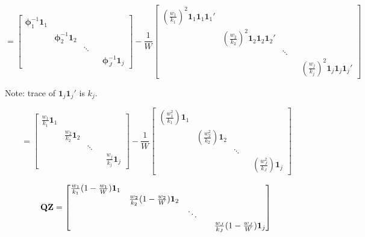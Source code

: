\begin{equation}
     = \begin{bmatrix}
        \mathbf{\phi}_1^{-1}\mathbf{1}_1  & & &  \\
         & \mathbf{\phi}_2^{-1}\mathbf{1}_2  & &  \\
         & & \ddots &  \\
         & & & &   \mathbf{\phi}_J^{-1}\mathbf{1}_j 
    \end{bmatrix} - \frac{1}{W} 
    \begin{bmatrix}
        (\frac{w_1}{k_1})^2\mathbf{1}_1\mathbf{1}_1\mathbf{1}_1' & & & &  \\
         &  (\frac{w_2}{k_2})^2\mathbf{1}_2\mathbf{1}_2\mathbf{1}_2' & & &   \\
         & & \ddots & &  \\
         & & & &  (\frac{w_j}{k_j})^2\mathbf{1}_j\mathbf{1}_j\mathbf{1}_j'
    \end{bmatrix}
     \nonumber
\end{equation}

Note: trace of  $\mathbf{1}_j\mathbf{1}_j'$ is $k_j$. 

\begin{equation}
     = \begin{bmatrix}
        \frac{w_1}{k_1}\mathbf{1}_1  & & & &  \\
         & \frac{w_2}{k_2}\mathbf{1}_2  & & &  \\
         & & \ddots & & \\
         & & & &   \frac{w_j}{k_j}\mathbf{1}_j 
    \end{bmatrix} - \frac{1}{W} 
    \begin{bmatrix}
        (\frac{w_1^2}{k_1})\mathbf{1}_1 & &   &  &     \\
         &  (\frac{w_2^2}{k_2})\mathbf{1}_2 & & &   \\
         & & \ddots & &  \\
         & & & &  (\frac{w_J^2}{k_J})\mathbf{1}_j
    \end{bmatrix}
    \nonumber
\end{equation}


\begin{equation}
   \mathbf{Q}\mathbf{Z} =  \begin{bmatrix}
        \frac{w_1}{k_1}(1 - \frac{w_1}{W})\mathbf{1}_1 & &   &  &     \\
         &  \frac{w_2}{k_2}(1 - \frac{w_2}{W})\mathbf{1}_2 & & &   \\
         & & \ddots & &  \\
         & & & & \frac{w_J}{k_J}(1 - \frac{w_J}{W})\mathbf{1}_j
    \end{bmatrix} 
    \nonumber
    \\
\end{equation}


